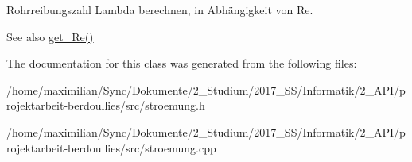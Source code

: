 Rohrreibungszahl Lambda berechnen, in Abhängigkeit von Re. 

\begin{DoxySeeAlso}{See also}
\hyperlink{class_rohrstroemung_aa491056aa77acac305aca0fde9c3e8bc}{get\+\_\+\+Re()} 
\end{DoxySeeAlso}


The documentation for this class was generated from the following files\+:\begin{DoxyCompactItemize}
\item 
/home/maximilian/\+Sync/\+Dokumente/2\+\_\+\+Studium/2017\+\_\+\+S\+S/\+Informatik/2\+\_\+\+A\+P\+I/projektarbeit-\/berdoullies/src/stroemung.\+h\item 
/home/maximilian/\+Sync/\+Dokumente/2\+\_\+\+Studium/2017\+\_\+\+S\+S/\+Informatik/2\+\_\+\+A\+P\+I/projektarbeit-\/berdoullies/src/stroemung.\+cpp\end{DoxyCompactItemize}
